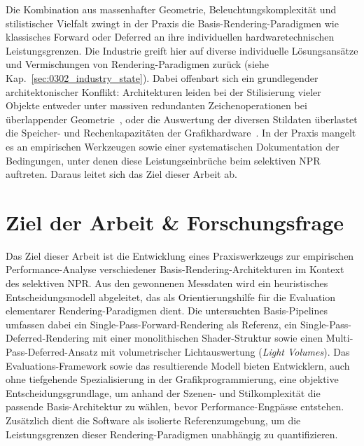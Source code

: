 Die Kombination aus massenhafter Geometrie, Beleuchtungskomplexität und stilistischer Vielfalt zwingt in der Praxis
die Basis-Rendering-Paradigmen wie klassisches Forward oder Deferred an ihre individuellen hardwaretechnischen
Leistungsgrenzen.
Die Industrie greift hier auf diverse individuelle Lösungsansätze und Vermischungen von Rendering-Paradigmen zurück
(siehe Kap.~\ref{sec:0302_industry_state}).
Dabei offenbart sich ein grundlegender architektonischer Konflikt:
Architekturen leiden bei der Stilisierung vieler Objekte entweder unter massiven redundanten Zeichenoperationen bei
überlappender Geometrie~\parencite[vgl.][Abschn.~1]{fatahalianReducingShadingGPUs2010},
oder die Auswertung der diversen Stildaten überlastet die Speicher- und Rechenkapazitäten der
Grafikhardware~\parencite[vgl.][Abschn.~6]{schiedDeferredAttributeInterpolation2015}.
In der Praxis mangelt es an empirischen Werkzeugen sowie einer systematischen Dokumentation der Bedingungen, unter denen
diese Leistungseinbrüche beim selektiven \ac{NPR} auftreten.
Daraus leitet sich das Ziel dieser Arbeit ab.


\section{Ziel der Arbeit \& Forschungsfrage}
\label{sec:0102_goal_and_core_question}

Das Ziel dieser Arbeit ist die Entwicklung eines Praxiswerkzeugs zur empirischen Per\-for\-mance\--Ana\-lyse
verschiedener Basis-Rendering-Architekturen im Kontext des selektiven \ac{NPR}.
Aus den gewonnenen Messdaten wird ein heuristisches Entscheidungsmodell abgeleitet, das als Orientierungshilfe
für die Evaluation elementarer Rendering-Paradigmen dient.
Die untersuchten Basis-Pipelines umfassen dabei ein Single-Pass-Forward-Rendering als Referenz, ein
Single-Pass-Deferred-Rendering mit einer monolithischen Shader-Struktur sowie einen Multi-Pass-Deferred-Ansatz mit
volumetrischer Lichtauswertung (\textit{Light Volumes}).
Das Evaluations-Framework sowie das resultierende Modell bieten Entwicklern, auch ohne tiefgehende
Spezialisierung in der Grafikprogrammierung, eine objektive Entscheidungsgrundlage, um anhand der
Szenen- und Stilkomplexität die passende Basis-Architektur zu wählen, bevor Performance-Engpässe entstehen.
Zusätzlich dient die Software als isolierte Referenzumgebung, um die Leistungsgrenzen dieser
Rendering-Paradigmen unabhängig zu quantifizieren.

